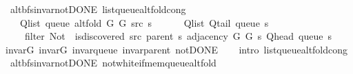 \begin{isabellebody}
\endisatagproof
{\isafoldproof}%
%
\isadelimproof
\isanewline
%
\endisadelimproof
\isanewline
{}\isamarkupfalse%
\ {\isacharparenleft}{\kern0pt}\ alt{\isacharunderscore}{\kern0pt}bfs{\isacharunderscore}{\kern0pt}invar{\isacharunderscore}{\kern0pt}not{\isacharunderscore}{\kern0pt}DONE{\isacharparenright}{\kern0pt}\ list{\isacharunderscore}{\kern0pt}queue{\isacharunderscore}{\kern0pt}alt{\isacharunderscore}{\kern0pt}fold{\isacharunderscore}{\kern0pt}cong{\isacharcolon}{\kern0pt}\isanewline
\ \ \isanewline
\ \ \ \ {\isachardoublequoteopen}Q{\isacharunderscore}{\kern0pt}list\ {\isacharparenleft}{\kern0pt}queue\ {\isacharparenleft}{\kern0pt}alt{\isacharunderscore}{\kern0pt}fold\ G{}\ G{}\ src\ s{\isacharparenright}{\kern0pt}{\isacharparenright}{\kern0pt}\ {\isacharequal}{\kern0pt}\isanewline
\ \ \ \ \ Q{\isacharunderscore}{\kern0pt}list\ {\isacharparenleft}{\kern0pt}Q{\isacharunderscore}{\kern0pt}tail\ {\isacharparenleft}{\kern0pt}queue\ s{\isacharparenright}{\kern0pt}{\isacharparenright}{\kern0pt}\ {\isacharat}{\kern0pt}\isanewline
\ \ \ \ \ filter\ {\isacharparenleft}{\kern0pt}Not\ {\isasymcirc}\ is{\isacharunderscore}{\kern0pt}discovered\ src\ {\isacharparenleft}{\kern0pt}parent\ s{\isacharparenright}{\kern0pt}{\isacharparenright}{\kern0pt}\ {\isacharparenleft}{\kern0pt}adjacency\ G{}\ G{}\ s\ {\isacharparenleft}{\kern0pt}Q{\isacharunderscore}{\kern0pt}head\ {\isacharparenleft}{\kern0pt}queue\ s{\isacharparenright}{\kern0pt}{\isacharparenright}{\kern0pt}{\isacharparenright}{\kern0pt}{\isachardoublequoteclose}\isanewline
%
\isadelimproof
\ \ %
\endisadelimproof
%
\isatagproof
{}\isamarkupfalse%
\ invar{\isacharunderscore}{\kern0pt}G{}\ invar{\isacharunderscore}{\kern0pt}G{}\ invar{\isacharunderscore}{\kern0pt}queue\ invar{\isacharunderscore}{\kern0pt}parent\ not{\isacharunderscore}{\kern0pt}DONE\isanewline
\ \ \isamarkupfalse%
\ {\isacharparenleft}{\kern0pt}intro\ list{\isacharunderscore}{\kern0pt}queue{\isacharunderscore}{\kern0pt}alt{\isacharunderscore}{\kern0pt}fold{\isacharunderscore}{\kern0pt}cong{\isacharparenright}{\kern0pt}%
\endisatagproof
{\isafoldproof}%
%
\isadelimproof
\isanewline
%
\endisadelimproof
%
\isadeliminvisible
\isanewline
%
\endisadeliminvisible
%
\isataginvisible
{}\isamarkupfalse%
\ {\isacharparenleft}{\kern0pt}\ alt{\isacharunderscore}{\kern0pt}bfs{\isacharunderscore}{\kern0pt}invar{\isacharunderscore}{\kern0pt}not{\isacharunderscore}{\kern0pt}DONE{\isacharparenright}{\kern0pt}\ not{\isacharunderscore}{\kern0pt}white{\isacharunderscore}{\kern0pt}if{\isacharunderscore}{\kern0pt}mem{\isacharunderscore}{\kern0pt}queue{\isacharunderscore}{\kern0pt}alt{\isacharunderscore}{\kern0pt}fold{\isacharcolon}{\kern0pt}\isanewline

\end{isabellebody}
